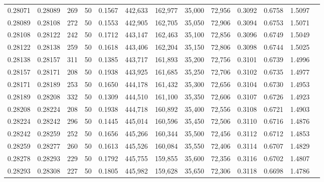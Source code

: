 \begin{tabular}{rrrrrrrrrrrrr}
0.28071 & 0.28089 &   269 &  50 &                                     0.1567 & 442,633 & 162,977 &  35,000 &  72,956 & 0.3092 & 0.6758 & 1.5097 \\
0.28089 & 0.28108 &   272 &  50 &                                     0.1553 & 442,905 & 162,705 &  35,050 &  72,906 & 0.3094 & 0.6753 & 1.5071 \\
0.28108 & 0.28122 &   242 &  50 &                                     0.1712 & 443,147 & 162,463 &  35,100 &  72,856 & 0.3096 & 0.6749 & 1.5049 \\
0.28122 & 0.28138 &   259 &  50 &                                     0.1618 & 443,406 & 162,204 &  35,150 &  72,806 & 0.3098 & 0.6744 & 1.5025 \\
0.28138 & 0.28157 &   311 &  50 &                                     0.1385 & 443,717 & 161,893 &  35,200 &  72,756 & 0.3101 & 0.6739 & 1.4996 \\
0.28157 & 0.28171 &   208 &  50 &                                     0.1938 & 443,925 & 161,685 &  35,250 &  72,706 & 0.3102 & 0.6735 & 1.4977 \\
0.28171 & 0.28189 &   253 &  50 &                                     0.1650 & 444,178 & 161,432 &  35,300 &  72,656 & 0.3104 & 0.6730 & 1.4953 \\
0.28189 & 0.28208 &   332 &  50 &                                     0.1309 & 444,510 & 161,100 &  35,350 &  72,606 & 0.3107 & 0.6726 & 1.4923 \\
0.28208 & 0.28224 &   208 &  50 &                                     0.1938 & 444,718 & 160,892 &  35,400 &  72,556 & 0.3108 & 0.6721 & 1.4903 \\
0.28224 & 0.28242 &   296 &  50 &                                     0.1445 & 445,014 & 160,596 &  35,450 &  72,506 & 0.3110 & 0.6716 & 1.4876 \\
0.28242 & 0.28259 &   252 &  50 &                                     0.1656 & 445,266 & 160,344 &  35,500 &  72,456 & 0.3112 & 0.6712 & 1.4853 \\
0.28259 & 0.28277 &   260 &  50 &                                     0.1613 & 445,526 & 160,084 &  35,550 &  72,406 & 0.3114 & 0.6707 & 1.4829 \\
0.28278 & 0.28293 &   229 &  50 &                                     0.1792 & 445,755 & 159,855 &  35,600 &  72,356 & 0.3116 & 0.6702 & 1.4807 \\
0.28293 & 0.28308 &   227 &  50 &                                     0.1805 & 445,982 & 159,628 &  35,650 &  72,306 & 0.3118 & 0.6698 & 1.4786 \\

\end{tabular}
